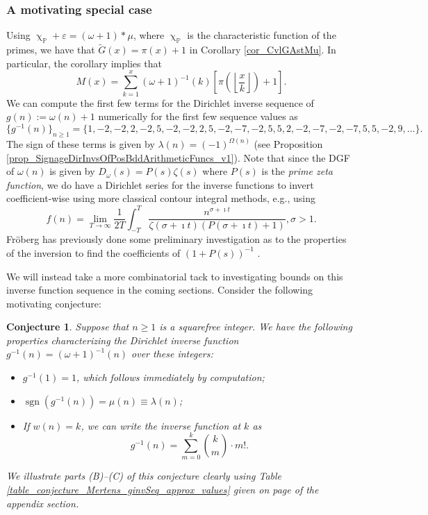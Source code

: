 \documentclass[11pt,reqno,a4letter]{article}
\numberwithin{figure}{section}
\numberwithin{table}{section}
\renewcommand{\chi}{\upchi}
\newcommand{\Floor}[2]{\ensuremath{\left\lfloor \frac{#1}{#2} \right\rfloor}}
\theoremstyle{plain}
\newtheorem{conjecture}[theorem]{Conjecture}
\numberwithin{theorem}{section}
\theoremstyle{definition}
\begin{document}
\subsubsection{A motivating special case} 
\label{example_InvertingARecRelForMx_Intro}
 
Using $\chi_{\mathbb{P}} + \varepsilon = (\omega + 1) \ast \mu$, 
where $\chi_{\mathbb{P}}$ is the characteristic 
function of the primes, we have that $\widetilde{G}(x) = \pi(x) + 1$ in 
Corollary \ref{cor_CvlGAstMu}. 
In particular, the corollary implies that 
\begin{equation} 
\label{eqn_Mx_gInvnPixk_formula} 
M(x) = \sum_{k=1}^{x} (\omega+1)^{-1}(k) \left[\pi\left(\Floor{x}{k}\right) + 1\right]. 
\end{equation} 
We can compute the first few terms for the
Dirichlet inverse sequence of 
$g(n) := \omega(n) + 1$ numerically for the first few sequence values as 
\[
\{g^{-1}(n)\}_{n \geq 1} = \{1, -2, -2, 2, -2, 5, -2, -2, 2, 5, -2, -7, -2, 5, 5, 2, -2, -7, -2, 
     -7, 5, 5, -2, 9, \ldots \}. 
\] 
The sign of these terms is given by $\lambda(n) = (-1)^{\Omega(n)}$ 
(see Proposition \ref{prop_SignageDirInvsOfPosBddArithmeticFuncs_v1}). 
Note that since the DGF of $\omega(n)$ is given by 
$D_{\omega}(s) = P(s) \zeta(s)$ where $P(s)$ is the \emph{prime zeta function}, we do have a 
Dirichlet series for the inverse functions to invert coefficient-wise using more classical 
contour integral methods, e.g., using \cite[\S 11]{APOSTOLANUMT} 
\[
f(n) = \lim_{T \rightarrow \infty} \frac{1}{2T} \int_{-T}^{T} 
     \frac{n^{\sigma+\imath t}}{\zeta(\sigma+\imath t)(P(\sigma+\imath t) + 1)}, \sigma > 1. 
\]
Fr\"oberg has previously done some preliminary investigation as to the properties of the 
inversion to find the coefficients of $(1+P(s))^{-1}$ \cite{FROBERG-1968}. 

We will instead take a more combinatorial tack to investigating bounds on this inverse function 
sequence in the coming sections. 
Consider the following motivating conjecture: 

\begin{conjecture}
\label{lemma_gInv_MxExample} 
Suppose that $n \geq 1$ is a squarefree integer. We have the following properties characterizing the 
Dirichlet inverse function $g^{-1}(n) = (\omega+1)^{-1}(n)$ over these integers: 
\begin{itemize} 

\item[(A)] $g^{-1}(1) = 1$, which follows immediately by computation; 
\item[(B)] $\operatorname{sgn}(g^{-1}(n)) = \mu(n) \equiv \lambda(n)$; 
\item[(C)] If $w(n) = k$, we can write the inverse function at $k$ as 
     \[
     g^{-1}(n) = \sum_{m=0}^{k} \binom{k}{m} \cdot m!. 
     \]
\end{itemize} 
We illustrate parts (B)--(C) of this conjecture clearly using 
Table \ref{table_conjecture_Mertens_ginvSeq_approx_values} given on 
page \pageref{table_conjecture_Mertens_ginvSeq_approx_values} of the appendix section. 
\end{conjecture} 
\end{document}
